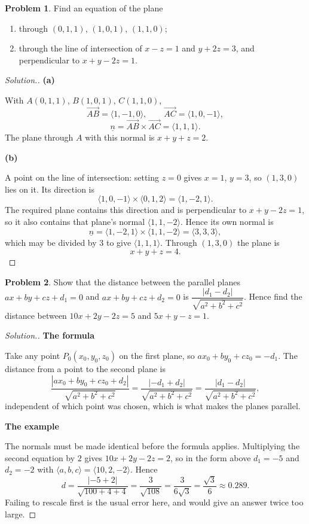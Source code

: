 \documentclass[11pt,a4paper]{article}
\theoremstyle{definition}
\newtheorem{problemx}{Problem}[subsection]
\newenvironment{problem}{\begin{problemx}}{\end{problemx}}
\newenvironment{solution}
  {\renewcommand{\qedsymbol}{}\begin{proof}[\textit{Solution}.]}
  {\end{proof}}
\newcommand{\subhead}[1]{%
  \par\medskip\noindent\textbf{#1}\par\nobreak\smallskip}
\begin{document}
\begin{problem}
Find an equation of the plane
\begin{enumerate}
\item[(a)] through $(0,1,1)$, $(1,0,1)$, $(1,1,0)$;
\item[(b)] through the line of intersection of $x-z=1$ and $y+2z=3$, and
perpendicular to $x+y-2z=1$.
\end{enumerate}
\end{problem}
\begin{solution}
\subhead{(a)}
With $A(0,1,1)$, $B(1,0,1)$, $C(1,1,0)$,
$$\overrightarrow{AB} = \langle 1,-1,0\rangle,\qquad
\overrightarrow{AC} = \langle 1,0,-1\rangle,$$
$$\underline{n} = \overrightarrow{AB}\times\overrightarrow{AC}
= \langle 1,1,1\rangle .$$
The plane through $A$ with this normal is $x+y+z = 2$.

\subhead{(b)}
A point on the line of intersection: setting $z=0$ gives $x=1$, $y=3$, so
$(1,3,0)$ lies on it. Its direction is
$$\langle 1,0,-1\rangle\times\langle 0,1,2\rangle = \langle 1,-2,1\rangle .$$
The required plane contains this direction and is perpendicular to
$x+y-2z=1$, so it also contains that plane's normal $\langle 1,1,-2\rangle$.
Hence its own normal is
$$\underline{n} = \langle 1,-2,1\rangle\times\langle 1,1,-2\rangle
= \langle 3,3,3\rangle ,$$
which may be divided by $3$ to give $\langle 1,1,1\rangle$. Through $(1,3,0)$
the plane is
$$x+y+z = 4 .$$
\end{solution}

\begin{problem}
Show that the distance between the parallel planes $ax+by+cz+d_1 = 0$ and
$ax+by+cz+d_2 = 0$ is
$\dfrac{\left|d_1-d_2\right|}{\sqrt{a^2+b^2+c^2}}$. Hence find the distance
between $10x+2y-2z=5$ and $5x+y-z=1$.
\end{problem}
\begin{solution}
\subhead{The formula}
Take any point $P_0(x_0,y_0,z_0)$ on the first plane, so
$ax_0+by_0+cz_0 = -d_1$. The distance from a point to the second plane is
$$\frac{\left|ax_0+by_0+cz_0+d_2\right|}{\sqrt{a^2+b^2+c^2}}
= \frac{\left|-d_1+d_2\right|}{\sqrt{a^2+b^2+c^2}}
= \frac{\left|d_1-d_2\right|}{\sqrt{a^2+b^2+c^2}} ,$$
independent of which point was chosen, which is what makes the planes parallel.

\subhead{The example}
The normals must be made identical before the formula applies. Multiplying the
second equation by $2$ gives $10x+2y-2z = 2$, so in the form above
$d_1 = -5$ and $d_2 = -2$ with $\langle a,b,c\rangle = \langle 10,2,-2\rangle$.
Hence
$$d = \frac{\left|-5+2\right|}{\sqrt{100+4+4}} = \frac{3}{\sqrt{108}}
= \frac{3}{6\sqrt3} = \frac{\sqrt3}{6}\approx 0.289 .$$
Failing to rescale first is the usual error here, and would give an answer
twice too large.
\end{solution}
\end{document}
